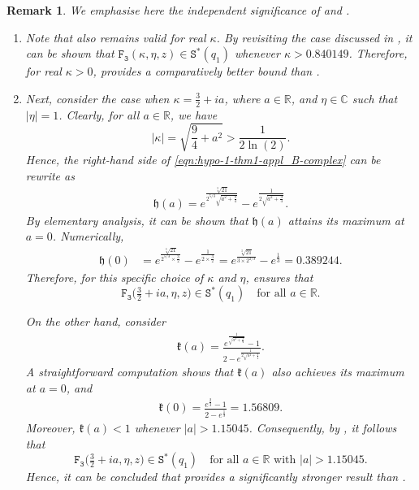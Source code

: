 \documentclass[a4paper,11pt,reqno]{amsart}
\newtheorem{remark}{Remark}[section]
\begin{document}
\begin{remark}\label{remark-2}
We emphasise here the independent significance of  and . 

\begin{enumerate}
    \item Note that  also remains valid for real $\kappa$. 
By revisiting the case discussed in , it can be shown that $\mathtt{F_3}(\kappa, \eta, z) \in \mathtt{S}^{\ast}(q_1)$ whenever $\kappa > 0.840149$. 
Therefore, for real $\kappa > 0$,  provides a comparatively better bound than .
\item 
Next, consider the case when $\kappa = \tfrac{3}{2} + i a$, where $a \in \mathbb{R}$, and $\eta \in \mathbb{C}$ such that $|\eta| = 1$. Clearly, for all $a \in \mathbb{R}$, we have
\[
|\kappa| = \sqrt{\frac{9}{4} + a^2} > \frac{1}{2 \ln(2)}.
\]
Hence, the right-hand side of \eqref{eqn:hypo-1-thm1-appl_B-complex} can be rewrite as
\begin{align}\label{eq:h-of-a}
    \mathfrak{h}(a) = e^{\frac{\sqrt[3]{21}}{ 2^{5/3} \sqrt{a^2 + \tfrac{9}{4}}}} - e^{\frac{1}{2 \sqrt{a^2 + \tfrac{9}{4}}}}.
\end{align}
By elementary analysis, it can be shown that $\mathfrak{h}(a)$ attains its maximum at $a = 0$. Numerically,
\begin{align}
    \mathfrak{h}(0) 
    &= e^{\frac{\sqrt[3]{21}}{ 2^{5/3} \times \tfrac{3}{2}}} - e^{\frac{1}{2 \times \tfrac{3}{2}}} 
    = e^{\frac{\sqrt[3]{21}}{ 3 \times 2^{2/3}}} - e^{\tfrac{1}{3}} 
    = 0.389244.
\end{align}
Therefore, for this specific choice of $\kappa$ and $\eta$,  ensures that 
\[
\mathtt{F_3}\big(\tfrac{3}{2} + i a, \eta, z\big) \in \mathtt{S}^{\ast}(q_1) \quad \text{for all } a \in \mathbb{R}.
\]

On the other hand, consider
\begin{align}\label{eq:k-of-a}
    \mathfrak{k}(a) = \frac{e^{\tfrac{1}{\sqrt{a^2 + \tfrac{9}{4}}}} - 1}{2 - e^{\tfrac{1}{2\sqrt{a^2 + \tfrac{9}{4}}}}}.
\end{align}
A straightforward computation shows that $\mathfrak{k}(a)$ also achieves its maximum at $a = 0$, and 
\begin{align}
    \mathfrak{k}(0) = \frac{e^{\tfrac{2}{3}} - 1}{2 - e^{\tfrac{1}{3}}} = 1.56809.
\end{align}
Moreover, $\mathfrak{k}(a) < 1$ whenever $|a| > 1.15045$. Consequently, by , it follows that
\[
\mathtt{F_3}\big(\tfrac{3}{2} + i a, \eta, z\big) \in \mathtt{S}^{\ast}(q_1)
\quad \text{for all } a \in \mathbb{R} \text{ with } |a| > 1.15045.
\]
Hence, it can be concluded that  provides a significantly stronger result than .
\end{enumerate}
\end{remark}
\end{document}
